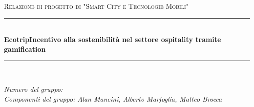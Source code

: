 \documentclass[12pt]{article}
\begin{document}

\begin{titlepage}

\newcommand{\HRule}{\rule{\linewidth}{0.5mm}}

\center

\textsc{\Large Relazione di progetto di "Smart City e Tecnologie Mobili"}\\[0.5cm]

\HRule \\[0.4cm]
{ \huge \bfseries Ecotrip\break\break\large Incentivo alla sostenibilità nel settore ospitality tramite gamification}\\[0.4cm]
\HRule \\[1.5cm]

\vfill

\begin{flushleft}
\emph{Numero del gruppo:}\\[1cm]
\emph{Componenti del gruppo: Alan Mancini, Alberto Marfoglia, Matteo Brocca}\\[3cm]
\end{flushleft}



\end{titlepage}


\tableofcontents

\newpage

 









%
%
\end{document}
